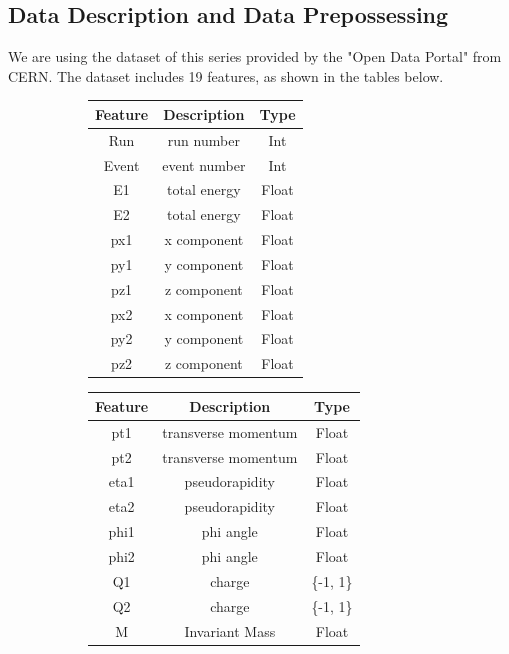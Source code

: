 \documentclass[12pt]{article}
\begin{document}
\subsection{Data Description and Data Prepossessing}

We are using the dataset of this series provided by the "Open Data Portal" from CERN. The dataset includes 19 features, as shown in the tables below. %
\begin{figure}[h]
\centering
\begin{subfigure}{0.5\textwidth}
  \centering
  \begin{tabular}{|c|c|c|}
    \hline
    \textbf{Feature} & \textbf{Description} & \textbf{Type} \\
    \hline
    Run & run number & Int\\
    Event & event number & Int\\
    E1 & total energy  & Float\\
    E2 & total energy  & Float\\
    px1 & x component  & Float\\
    py1 & y component  & Float\\
    pz1 & z component  & Float\\
    px2 & x component & Float\\
    py2 & y component & Float\\
    pz2 & z component & Float\\
    
    \hline
  \end{tabular}
\end{subfigure}%
\begin{subfigure}{0.5\textwidth}
  \centering
  \begin{tabular}{|c|c|c|}
    \hline
    \textbf{Feature} & \textbf{Description} & \textbf{Type} \\
    \hline
    pt1 & transverse momentum  & Float\\
    pt2 & transverse momentum  & Float\\
    eta1 & pseudorapidity  & Float\\
    eta2 & pseudorapidity  & Float\\
    phi1 & phi angle & Float\\
    phi2 & phi angle  & Float\\
    Q1 & charge & \{-1, 1\}\\ 
    Q2 & charge  & \{-1, 1\}\\
    M & Invariant Mass & Float\\
    \hline
  \end{tabular}
\end{subfigure}
\end{figure}
\end{document}
